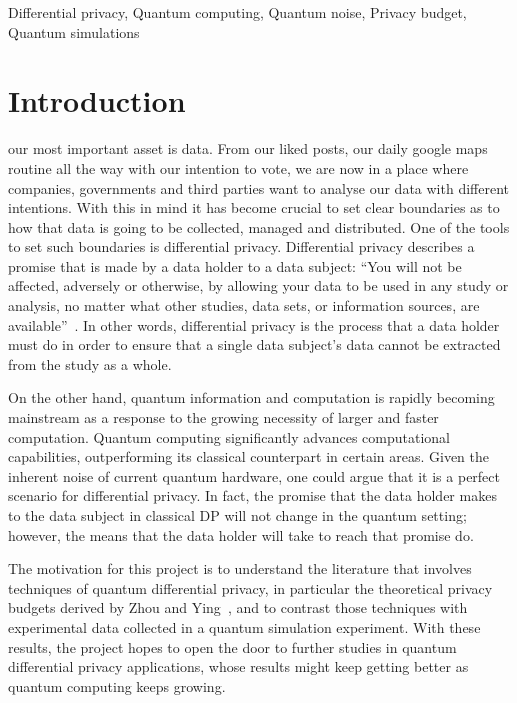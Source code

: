 \documentclass{ieeeaccess}
\begin{document}
\begin{keywords}
  Differential privacy, Quantum computing, Quantum noise, Privacy budget, Quantum simulations
\end{keywords}

\titlepgskip=-15pt

\maketitle

\section{Introduction}
\label{sec:introduction}
 our most important asset is data. From our liked posts, our daily google maps routine all the way with our intention to vote, we are now in a place where companies, governments and third parties want to analyse our data with different intentions. With this in mind it has become crucial to set clear boundaries as to how that data is going to be collected, managed and distributed. One of the tools to set such boundaries is differential privacy. Differential privacy describes a promise that is made by a data holder to a data subject: ``You will not be affected, adversely or otherwise, by allowing your data to be used in any study or analysis, no matter what other studies, data sets, or information sources, are available''~\cite{dwork2014algorithmic}. In other words, differential privacy is the process that a data holder must do in order to ensure that a single data subject's data cannot be extracted from the study as a whole.

On the other hand, quantum information and computation is rapidly becoming mainstream as a response to the growing necessity of larger and faster computation. Quantum computing significantly advances computational capabilities, outperforming its classical counterpart in certain areas. Given the inherent noise of current quantum hardware, one could argue that it is a perfect scenario for differential privacy. In fact, the promise that the data holder makes to the data subject in classical DP will not change in the quantum setting; however, the means that the data holder will take to reach that promise do.

The motivation for this project is to understand the literature that involves techniques of quantum differential privacy, in particular the theoretical privacy budgets derived by Zhou and Ying~\cite{zhou2017differential}, and to contrast those techniques with experimental data collected in a quantum simulation experiment. With these results, the project hopes to open the door to further studies in quantum differential privacy applications, whose results might keep getting better as quantum computing keeps growing.
\end{document}
